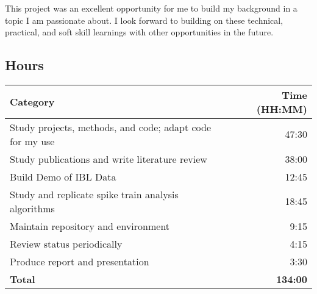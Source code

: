 \documentclass[11pt]{article}
\newcommand{\subsectionwithindent}[1]{
    \subsection*{#1}
    \hspace{\parindent} %
}
\begin{document}
This project was an excellent opportunity for me to build my background in a topic I am passionate about. I look forward to building on these technical, practical, and soft skill learnings with other opportunities in the future.

\newpage
\subsectionwithindent{Hours}

\begin{tabular}{l r}
    \hline
    \textbf{Category} & \textbf{Time (HH:MM)}\\
    \hline
    Study projects, methods, and code; adapt code for my use & 47:30\\
    Study publications and write literature review & 38:00\\
    Build Demo of IBL Data & 12:45\\
    Study and replicate spike train analysis algorithms & 18:45\\
    Maintain repository and environment & 9:15\\
    Review status periodically & 4:15\\
    Produce report and presentation & 3:30\\
    \hline
    \textbf{Total} & \textbf{134:00}\\
    \hline
\end{tabular}
\end{document}
